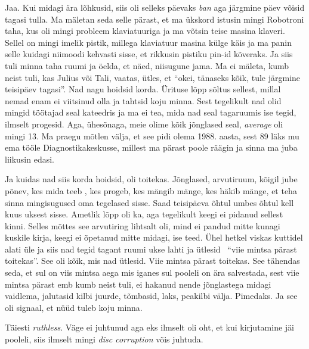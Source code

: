 
Jaa. Kui midagi ära lõhkusid, siis oli selleks päevaks \emph{ban} aga järgmine 
päev võisid tagasi tulla. Ma mäletan seda selle pärast, et ma ükskord istusin 
mingi Robotroni taha, kus oli mingi probleem klaviatuuriga ja ma võtsin teise 
masina klaveri. Sellel on mingi imelik pistik, millega klaviatuur masina külge 
käis ja ma panin selle kuidagi niimoodi kehvasti sisse, et rikkusin pistiku 
pin-id  kõveraks. Ja siis tuli minna taha ruumi  
ja  öelda, et näed,  niisugune jama. Ma ei mäleta, kumb neist tuli, kas Julius 
või Tali, vaatas, ütles, et \enquote{okei, tänaseks kõik,  tule järgmine 
teisipäev tagasi}. Nad nagu hoidsid korda.  Ürituse  
 lõpp sõltus sellest, millal nemad enam ei viitsinud olla ja tahtsid 
koju minna. Sest tegelikult nad olid mingid töötajad seal kateedris ja ma ei 
tea, mida nad seal tagaruumis ise tegid, ilmselt progesid. Aga, ühesõnaga, meie 
olime kõik jõnglased seal, \emph{average} oli mingi 13. Ma praegu mõtlen välja, 
et see pidi olema 1988.  aasta, sest 89 läks mu ema tööle 
Diagnostikakeskusse, millest ma pärast poole räägin ja 
sinna ma juba liikusin edasi. 

Ja kuidas nad siis korda hoidsid, oli toitekas. Jõnglased, arvutiruum, kõigil jube 
põnev, kes mida teeb , kes progeb, kes mängib mänge, kes häkib mänge, et teha 
sinna mingisugused oma tegelased sisse. Saad teisipäeva õhtul umbes õhtul kell 
kuus uksest sisse. Ametlik lõpp oli ka, aga tegelikult keegi ei pidanud 
sellest kinni. Selles mõttes see arvutiring lihtsalt oli, mind ei pandud mitte 
kunagi kuskile kirja, keegi ei õpetanud mitte midagi, ise teed. Ühel hetkel 
viskas kuttidel alati üle ja siis nad tegid tagant ruumi ukse lahti ja ütlesid 
\enquote{viie mintsa pärast toitekas}. See oli kõik, mis nad ütlesid. Viie 
mintsa pärast toitekas. See tähendas seda, et sul on viis mintsa aega mis 
iganes sul pooleli on ära salvestada, sest viie mintsa pärast emb kumb neist  
tuli,  ei hakanud nende jõnglastega midagi vaidlema, jalutasid kilbi juurde, 
tõmbasid, laks, peakilbi välja. Pimedaks. Ja see oli signaal, et nüüd tuleb koju 
minna. 


Täiesti \emph{ruthless}. Väge ei juhtunud aga eks ilmselt oli oht, et kui 
kirjutamine jäi pooleli, siis ilmselt mingi \emph{disc corruption} võis 
juhtuda. 

